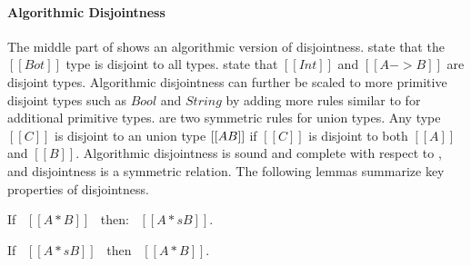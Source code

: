 \begin{comment}
\begin{figure}[t]
  \begin{small}
    \centering
    \drules[ad]{$[[A * B]]$}{Algorithmic Disjointness}{btmr, btml, intl, intr, orl, orr}
  \end{small}
  \caption{Algorithmic Disjointness for \cal.}
  \label{fig:union:ad}
\end{figure}
\end{comment}

\paragraph{Algorithmic Disjointness}
The middle part of  shows an algorithmic
version of disjointness.   state that the $[[Bot]]$
type is disjoint to all types.   state that
$[[Int]]$ and $[[A -> B]]$ are disjoint types.  Algorithmic
disjointness can further be scaled to more primitive disjoint types
such as $Bool$ and $String$ by adding more rules similar to
 for additional primitive types.   are two symmetric rules for union types. Any type $[[C]]$ is
disjoint to an union type $[[A \/ B]]$ if $[[C]]$ is disjoint to both
$[[A]]$ and $[[B]]$.  Algorithmic disjointness is sound and complete
with respect to , and disjointness is a symmetric
relation. The following lemmas summarize key properties of disjointness.

\begin{lemma}
  If \ $[[A * B]]$ \ then: \ $[[A *s B]]$.
\label{lemma:union:disj-sound}
\end{lemma}

\begin{comment}
\begin{proof}
  By induction on algorithmic disjointness relation.
  \begin{itemize}
    \item Cases \rref{ad-btmr, ad-btml, ad-orl, ad-orr} require induction on hypothesis
          and \Cref{lemma:union:sub-or}.
    \item Cases \rref{ad-intl, ad-intr} require induction on type and \Cref{lemma:union:sub-or}.
  \end{itemize}
\end{proof}
\end{comment}

\begin{lemma}
  If \ $[[A *s B]]$ \ then \ $[[A * B]]$.
\label{lemma:union:disj-complete}
\end{lemma}

